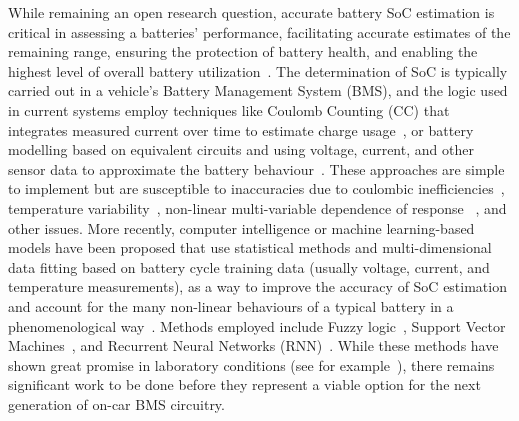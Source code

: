 %
%
While remaining an open research question, accurate battery SoC estimation is critical in assessing a batteries' performance, facilitating accurate estimates of the remaining range, ensuring the protection of battery health, and enabling the highest level of overall battery utilization~\cite{yamin_embedded_2014}.
The determination of SoC is typically carried out in a vehicle's Battery Management System (BMS), and the logic used in current systems employ techniques like Coulomb Counting (CC) that integrates measured current over time to estimate charge usage~\cite{robust_SoC}, or battery modelling based on equivalent circuits and using voltage, current, and other sensor data to approximate the battery behaviour~\cite{6953745}. %
These approaches are simple to implement but are susceptible to inaccuracies due to coulombic inefficiencies~\cite{Smith_2010}, temperature variability~\cite{xing_state_2014}, non-linear multi-variable dependence of response ~\cite{hansen_support_2005,anton_battery_2013,he_state_2014}, and other issues.
More recently, computer intelligence or machine learning-based models have been proposed that use statistical methods and multi-dimensional data fitting based on battery cycle training data (usually voltage, current, and temperature measurements), as a way to improve the accuracy of SoC estimation and account for the many non-linear behaviours of a typical battery in a phenomenological way~\cite{hansen_support_2005,anton_battery_2013,he_state_2014}.
Methods employed include Fuzzy logic~\cite{malkhandi_fuzzy_2006}, Support Vector Machines~\cite{hansen_support_2005, anton_battery_2013}, and Recurrent Neural Networks (RNN)~\cite{song_lithium-ion_2018,Chemali2017,mamo_long_2020,jiao_gru-rnn_2020,xiao_accurate_2019,javid_adaptive_2020,zhang_deep_2020}.
While these methods have shown great promise in laboratory conditions (see for example~\cite{jiao_gru-rnn_2020}), there remains significant work to be done before they represent a viable option for the next generation of on-car BMS circuitry.

